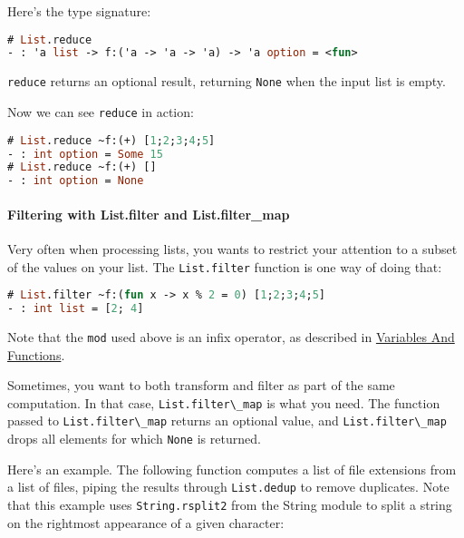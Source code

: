 Here's the type signature:

\begin{lstlisting}[language=Caml]
# List.reduce
- : 'a list -> f:('a -> 'a -> 'a) -> 'a option = <fun>
\end{lstlisting}

\passthrough{\lstinline!reduce!} returns an optional result, returning
\passthrough{\lstinline!None!} when the input list is empty.

Now we can see \passthrough{\lstinline!reduce!} in action:

\begin{lstlisting}[language=Caml]
# List.reduce ~f:(+) [1;2;3;4;5]
- : int option = Some 15
# List.reduce ~f:(+) []
- : int option = None
\end{lstlisting}

\hypertarget{filtering-with-list.filter-and-list.filter_map}{%
\paragraph{Filtering with List.filter and
List.filter\_map}\label{filtering-with-list.filter-and-list.filter_map}}

Very often when processing lists, you wants to restrict your attention
to a subset of the values on your list. The
\passthrough{\lstinline!List.filter!} function is one way of doing
that:

\begin{lstlisting}[language=Caml]
# List.filter ~f:(fun x -> x % 2 = 0) [1;2;3;4;5]
- : int list = [2; 4]
\end{lstlisting}

Note that the \passthrough{\lstinline!mod!} used above is an infix
operator, as described in
\href{variables-and-functions.html\#variables-and-functions}{Variables
And Functions}.

Sometimes, you want to both transform and filter as part of the same
computation. In that case, \passthrough{\lstinline!List.filter\_map!} is
what you need. The function passed to
\passthrough{\lstinline!List.filter\_map!} returns an optional value,
and \passthrough{\lstinline!List.filter\_map!} drops all elements for
which \passthrough{\lstinline!None!} is returned.

Here's an example. The following function computes a list of file
extensions from a list of files, piping the results through
\passthrough{\lstinline!List.dedup!} to remove duplicates. Note that
this example uses \passthrough{\lstinline!String.rsplit2!} from the
String module to split a string on the rightmost appearance of a given
character:


